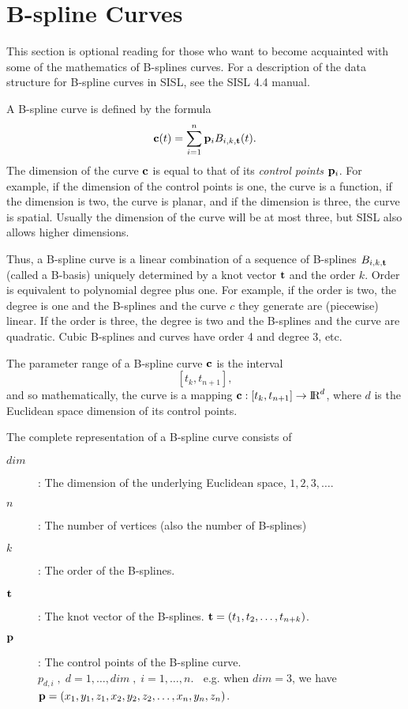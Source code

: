 \section{B-spline Curves}

This section is optional reading for those who want to
become acquainted with some of the mathematics of
B-splines curves. For a description of the data structure for
B-spline curves in SISL, see the SISL 4.4 manual.

A B-spline curve is defined by the formula
$$ {\bf c}(t) = \sum_{i=1}^{n} {\bf p}_{i} B_{i,k,{\bf t}}(t). $$
The dimension of the curve ${\bf c}$ is equal to that of its
{\it control points} ${\bf p}_i$. For example, if the dimension of the
control points
is one, the curve is a function, if the dimension is two,
the curve is planar, and if the dimension is three,
the curve is spatial.
Usually the dimension of the curve will be at most three,
but SISL also allows higher dimensions.

Thus, a B-spline curve is a linear combination of a sequence of B-splines
$B_{i,k,{\bf t}}$ (called a B-basis)
uniquely determined by a knot vector ${\bf t}$ and
the order $k$. Order is equivalent to polynomial degree plus one.
For example, if the order is two, the degree is one and the B-splines
and the curve $c$ they generate are (piecewise) linear.
If the order is three, the degree is two and the B-splines and
the curve are quadratic. Cubic B-splines and
curves have order 4 and degree 3, etc.

The parameter range of a B-spline curve ${\bf c}$ is the interval
$$ [t_k, t_{n+1}], $$
and so mathematically, the curve is a mapping
${\bf c}: [t_k, t_{n+1}] \to \hbox{\rm I\negthinspace R}^d$, where $d$ is the Euclidean space
dimension of its control points.

The complete representation of a B-spline curve consists of
\begin{description}
\item[$dim$]: The dimension of the underlying Euclidean space,
              $1,2,3,\ldots$.
\item[$n$]: The number of vertices (also the number of B-splines)
\item[$k$]: The order of the B-splines.
\item[${\bf t}$]: The knot vector of the B-splines.
            ${\bf t} = (t_1, t_2, \ldots, t_{n+k})$.
\item[${\bf p}$]: The control points of the B-spline curve.
           $p_{d,i}\;,\; d=1,\ldots,dim\;,\;
                i=1,\ldots,n.\;\;$
                e.g. when $dim = 3$, we have
                ${\bf p} = (x_1,y_1,z_1,x_2,y_2,z_2,\ldots,x_n,y_n,z_n)$.
\end{description}

